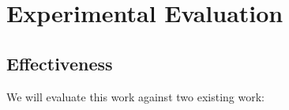 \section{Experimental Evaluation}

\subsection{Effectiveness}
We will evaluate this work against two existing work:

%